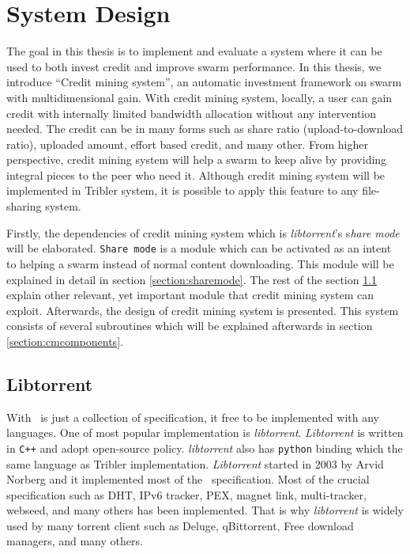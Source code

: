 \chapter{System Design}
\label{chp:design}

The goal in this thesis is to implement and evaluate a system where it can be used to both invest credit and improve swarm performance. In this thesis, we introduce ``Credit mining system'', an automatic investment framework on swarm with multidimensional gain. With credit mining system, locally, a user can gain credit with internally limited bandwidth allocation without any intervention needed. The credit can be in many forms such as share ratio (upload-to-download ratio), uploaded amount, effort based credit, and many other. From higher perspective, credit mining system will help a swarm to keep alive by providing integral pieces to the peer who need it. Although credit mining system will be implemented in Tribler system, it is possible to apply this feature to any file-sharing system.

Firstly, the dependencies of credit mining system which is \textit{libtorrent}'s s\textit{hare mode} will be elaborated. \texttt{Share mode} is a module which can be activated as an intent to helping a swarm instead of normal content downloading. This module will be explained in detail in section \ref{section:sharemode}. The rest of the section \ref{section:libtorrent} explain other relevant, yet important module that credit mining system can exploit. Afterwards, the design of credit mining system is presented. This system consists of several subroutines which will be explained afterwards in section \ref{section:cmcomponents}. 

\section{Libtorrent}
\label{section:libtorrent}
With \bt~is just a collection of specification, it free to be implemented with any languages. One of most popular implementation is \textit{libtorrent}. \textit{Libtorrent} is written in \texttt{C++} and adopt open-source policy. \textit{libtorrent} also has \texttt{python} binding which the same language as Tribler implementation. \textit{Libtorrent} started in 2003 by Arvid Norberg and it implemented most of the \bt~specification. Most of the crucial specification such as DHT, IPv6 tracker, PEX, magnet link, multi-tracker, webseed, and many others has been implemented. That is why \textit{libtorrent} is widely used by many torrent client such as Deluge, qBittorrent, Free download managers, and many others.

